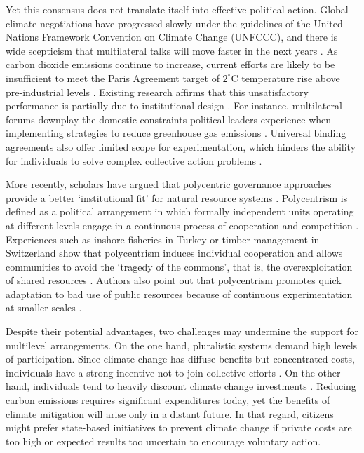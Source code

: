 \documentclass[a4paper,12pt]{article}
\begin{document}
Yet this consensus does not translate itself into effective political action. Global climate negotiations have progressed slowly under the guidelines of the United Nations Framework Convention on Climate Change (UNFCCC), and there is wide scepticism that multilateral talks will move faster in the next years \citep{cole2015advantages, hjerpe2015views}. As carbon dioxide emissions continue to increase, current efforts are likely to be insufficient to meet the Paris Agreement target of $2^{\circ}$C temperature rise above pre-industrial levels \citep{jordan2015emergence}. Existing research affirms that this unsatisfactory performance is partially due to institutional design \citep{ostrom2014polycentric, cole2015advantages}. For instance, multilateral forums downplay the domestic constraints political leaders experience when implementing strategies to reduce greenhouse gas emissions \citep{rayner2010eat}. Universal binding agreements also offer limited scope for experimentation, which hinders the ability for individuals to solve complex collective action problems \citep{de2014global}.

More recently, scholars have argued that polycentric governance approaches provide a better `institutional fit' for natural resource systems \citep{turnheim2018innovating,berkhout2003negotiating, carlisle2017polycentric, ostrom1990governing}. Polycentrism is defined as a political arrangement in which formally independent units operating at different levels engage in a continuous process of cooperation and competition \citep{cole2015advantages,aligica2013co}. Experiences such as inshore fisheries in Turkey or timber management in Switzerland show that polycentrism induces individual cooperation and allows communities to avoid the `tragedy of the commons', that is, the overexploitation of shared resources \citep{hardin1968tragedy, ostrom1990governing}. Authors also point out that polycentrism promotes quick adaptation to bad use of public resources because of continuous experimentation at smaller scales \citep{turnheim2018innovating,ostrom2012nested,ostrom2014polycentric,sovacool2013adaptation}. 


Despite their potential advantages, two challenges may undermine the support for multilevel arrangements. On the one hand, pluralistic systems demand high levels of participation. Since climate change has diffuse benefits but concentrated costs, individuals have a strong incentive not to join collective efforts \citep{barrett2003increasing, heitzig2011self, nordhaus2015climate}. On the other hand, individuals tend to heavily discount climate change investments \citep{dasgupta2008discounting, nordhaus1997discounting}. Reducing carbon emissions requires significant expenditures today, yet the benefits of climate mitigation will arise only in a distant future. In that regard, citizens might prefer state-based initiatives to prevent climate change if private costs are too high or expected results too uncertain to encourage voluntary action. 
\end{document}
